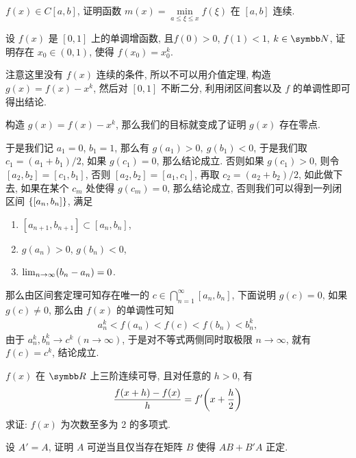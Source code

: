 \begin{exercise}[series=exer]
    \item $ f(x) \in C[a, b] $, 证明函数 $ m(x) = \min\limits_{a \le \xi \le x}f(\xi) $ 在 $ [a, b] $ 连续.
    \item 设 $ f(x) $ 是 $ [0, 1] $ 上的单调增函数, 且$ f(0) > 0 $, $ f(1) < 1 $, $ k \in \N $, 证明存在 $ x_{0} \in (0, 1) $, 使得 $ f(x_{0}) = x_{0}^{k} $. 
    \begin{hint}
        注意这里没有 $ f(x) $ 连续的条件, 所以不可以用介值定理, 构造 $ g(x) = f(x) - x^{k} $, 然后对 $ [0, 1] $ 不断二分, 利用闭区间套以及 $ f $ 的单调性即可得出结论.
    \end{hint}
    \begin{answer}
        构造 $ g(x) = f(x) - x^{k} $, 那么我们的目标就变成了证明 $ g(x) $ 存在零点. 

        于是我们记 $ a_{1} = 0 $, $ b_{1} = 1 $, 那么有 $ g(a_{1}) > 0,\ g(b_{1}) < 0 $, 于是我们取 $ c_{1} = (a_{1} + b_{1})/2 $, 如果 $ g(c_{1}) = 0 $, 那么结论成立. 否则如果 $ g(c_{1}) > 0 $, 则令 $ [a_{2}, b_{2}] = [c_{1}, b_{1}] $, 否则 $ [a_{2}, b_{2}] = [a_{1}, c_{1}] $, 再取 $ c_{2} = (a_{2} + b_{2})/2 $, 如此做下去, 如果在某个 $ c_{m} $ 处使得 $ g(c_{m}) = 0 $, 那么结论成立, 否则我们可以得到一列闭区间 $ \qty{[a_{n}, b_{n}]} $, 满足
        \begin{enumerate}
            \item $ [a_{n + 1}, b_{n + 1}] \subset [a_{n}, b_{n}] $,
            \item $ g(a_{n}) > 0 $, $ g(b_{n}) < 0 $,
            \item $ \lim_{n \to \infty}(b_{n} - a_{n}) = 0 $. 
        \end{enumerate}
        那么由区间套定理可知存在唯一的 $ c \in \bigcap_{n = 1}^{\infty} [a_{n}, b_{n}] $, 下面说明 $ g(c) = 0 $, 如果 $ g(c) \ne 0 $, 那么由 $ f(x) $ 的单调性可知
        \begin{align*}
            a_{n}^{k} < f(a_{n}) < f(c) < f(b_{n}) < b_{n}^{k},
        \end{align*}
        由于 $ a_{n}^{k}, b_{n}^{k} \to c^{k}\,(n \to \infty) $, 于是对不等式两侧同时取极限 $ n \to \infty $, 就有 $ f(c) = c^{k} $, 结论成立. 
    \end{answer}
    \item $ f(x) $ 在 $ \R $ 上三阶连续可导, 且对任意的 $ h > 0 $, 有
    \begin{align*}
        \frac{f(x + h) - f(x)}{h} = f'\qty(x + \frac{h}{2})
    \end{align*}
    求证: $ f(x) $ 为次数至多为 2 的多项式.
    \item 设 $ A' = A $, 证明 $ A $ 可逆当且仅当存在矩阵 $ B $ 使得 $ AB + B'A $ 正定.

\end{exercise}
